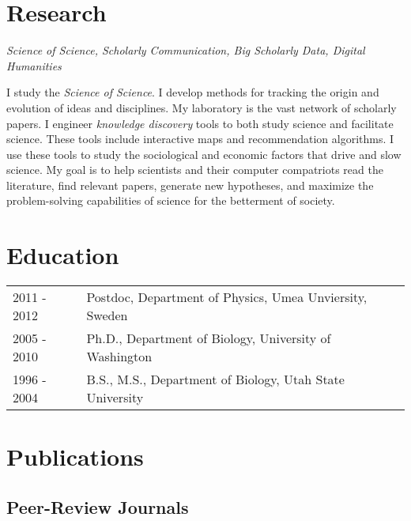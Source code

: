 \documentclass[11pt]{article}
\begin{document}
\section*{\textbf{Research}}


\textit{Science of Science, Scholarly Communication, Big Scholarly Data, Digital Humanities}

\vspace{4mm}

I study the \textit{Science of Science}. I develop methods for tracking the origin and evolution of ideas and disciplines. My laboratory is the vast network of scholarly papers. I engineer \textit{knowledge discovery} tools to both study science and facilitate science. These tools include interactive maps and recommendation algorithms. I use these tools to study the sociological and economic factors that drive and slow science. My goal is to help scientists and their computer compatriots read the literature, find relevant papers, generate new hypotheses, and maximize the problem-solving capabilities of science for the betterment of society. 



\section*{\textbf{Education}}

\begin{tabular}{ll}
	2011 - 2012 & Postdoc, Department of Physics, Umea Unviersity, Sweden \\
	2005 - 2010 & Ph.D., Department of Biology, University of Washington \\
	1996 - 2004 & B.S., M.S., Department of Biology, Utah State University \\
\end{tabular}


\setlength{\extrarowheight}{10pt}


\section*{\textbf{Publications}}

\subsection*{\textbf{Peer-Review Journals}}
\end{document}
